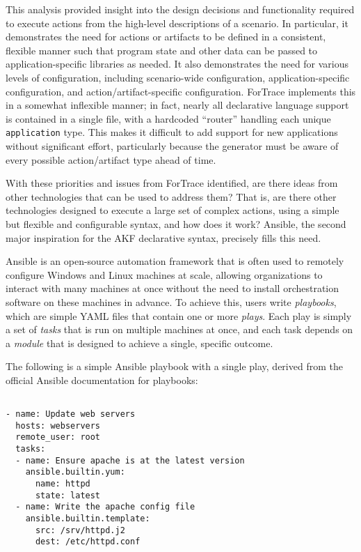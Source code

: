 \documentclass[letterpaper,12pt]{report}
\newcommand{\passthrough}[1]{#1}
\begin{document}
This analysis provided insight into the design decisions and
functionality required to execute actions from the high-level
descriptions of a scenario. In particular, it demonstrates the need for
actions or artifacts to be defined in a consistent, flexible manner such
that program state and other data can be passed to application-specific
libraries as needed. It also demonstrates the need for various levels of
configuration, including scenario-wide configuration,
application-specific configuration, and action/artifact-specific
configuration. ForTrace implements this in a somewhat inflexible manner;
in fact, nearly all declarative language support is contained in a
single file, with a hardcoded ``router'' handling each unique
\passthrough{\lstinline!application!} type. This makes it difficult to
add support for new applications without significant effort,
particularly because the generator must be aware of every possible
action/artifact type ahead of time.

With these priorities and issues from ForTrace identified, are there
ideas from other technologies that can be used to address them? That is,
are there other technologies designed to execute a large set of complex
actions, using a simple but flexible and configurable syntax, and how
does it work? Ansible, the second major inspiration for the AKF
declarative syntax, precisely fills this need.

Ansible is an open-source automation framework that is often used to
remotely configure Windows and Linux machines at scale, allowing
organizations to interact with many machines at once without the need to
install orchestration software on these machines in advance. To achieve
this, users write \emph{playbooks}, which are simple YAML files that
contain one or more \emph{plays}. Each play is simply a set of
\emph{tasks} that is run on multiple machines at once, and each task
depends on a \emph{module} that is designed to achieve a single,
specific outcome.

The following is a simple Ansible playbook with a single play, derived
from the official Ansible documentation for playbooks:

\begin{lstlisting}

- name: Update web servers
  hosts: webservers
  remote_user: root
  tasks:
  - name: Ensure apache is at the latest version
    ansible.builtin.yum:
      name: httpd
      state: latest
  - name: Write the apache config file
    ansible.builtin.template:
      src: /srv/httpd.j2
      dest: /etc/httpd.conf
\end{lstlisting}
\end{document}
